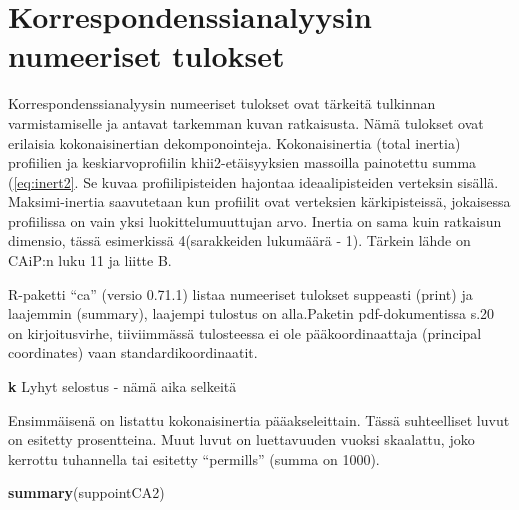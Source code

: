 \documentclass[
  finnish,
]{book}
\newenvironment{Shaded}{\begin{snugshade}}{\end{snugshade}}
\newcommand{\KeywordTok}[1]{\textcolor[rgb]{0.13,0.29,0.53}{\textbf{#1}}}
\newcommand{\NormalTok}[1]{#1}
\begin{document}
\hypertarget{korrespondenssianalyysin-numeeriset-tulokset}{%
\section{Korrespondenssianalyysin numeeriset tulokset}\label{korrespondenssianalyysin-numeeriset-tulokset}}

Korrespondenssianalyysin numeeriset tulokset ovat tärkeitä tulkinnan varmistamiselle
ja antavat tarkemman kuvan ratkaisusta. Nämä tulokset ovat erilaisia kokonaisinertian
dekomponointeja. Kokonaisinertia (total inertia) profiilien ja keskiarvoprofiilin
khii2-etäisyyksien massoilla painotettu summa (\eqref{eq:inert2}. Se kuvaa
profiilipisteiden hajontaa ideaalipisteiden verteksin sisällä. Maksimi-inertia
saavutetaan kun profiilit ovat verteksien kärkipisteissä, jokaisessa profiilissa
on vain yksi luokittelumuuttujan arvo. Inertia on sama kuin ratkaisun dimensio,
tässä esimerkissä 4(sarakkeiden lukumäärä - 1). Tärkein lähde on CAiP:n luku 11
ja liitte B.

R-paketti ``ca'' (versio 0.71.1) listaa numeeriset tulokset suppeasti (print) ja laajemmin
(summary), laajempi tulostus on alla.Paketin pdf-dokumentissa s.20 on kirjoitusvirhe, tiiviimmässä
tulosteessa ei ole pääkoordinaattaja (principal coordinates) vaan standardikoordinaatit.

\textbf{k} Lyhyt selostus - nämä aika selkeitä

Ensimmäisenä on listattu kokonaisinertia pääakseleittain. Tässä suhteelliset luvut
on esitetty prosentteina. Muut luvut on luettavuuden vuoksi skaalattu, joko kerrottu
tuhannella tai esitetty ``permills'' (summa on 1000).

\begin{Shaded}
\begin{Highlighting}[]
\KeywordTok{summary}\NormalTok{(suppointCA2)}
\end{Highlighting}
\end{Shaded}
\end{document}

